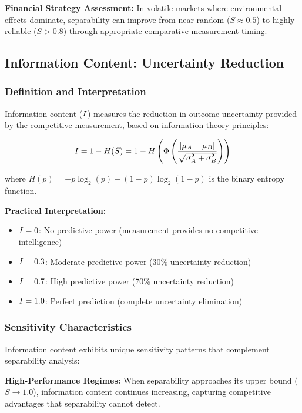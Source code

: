 \textbf{Financial Strategy Assessment:} In volatile markets where environmental effects dominate, separability can improve from near-random ($S \approx 0.5$) to highly reliable ($S > 0.8$) through appropriate comparative measurement timing.

\subsection{Information Content: Uncertainty Reduction}

\subsubsection{Definition and Interpretation}  

Information content ($I$) measures the reduction in outcome uncertainty provided by the competitive measurement, based on information theory principles:

\begin{equation}
I = 1 - H(S) = 1 - H\left(\Phi\left(\frac{|\mu_A - \mu_B|}{\sqrt{\sigma_A^2 + \sigma_B^2}}\right)\right)
\end{equation}

where $H(p) = -p \log_2(p) - (1-p) \log_2(1-p)$ is the binary entropy function.

\textbf{Practical Interpretation:}
\begin{itemize}
\item $I = 0$: No predictive power (measurement provides no competitive intelligence)
\item $I = 0.3$: Moderate predictive power (30\% uncertainty reduction)
\item $I = 0.7$: High predictive power (70\% uncertainty reduction)  
\item $I = 1.0$: Perfect prediction (complete uncertainty elimination)
\end{itemize}

\subsubsection{Sensitivity Characteristics}

Information content exhibits unique sensitivity patterns that complement separability analysis:

\textbf{High-Performance Regimes:} When separability approaches its upper bound ($S \to 1.0$), information content continues increasing, capturing competitive advantages that separability cannot detect.


